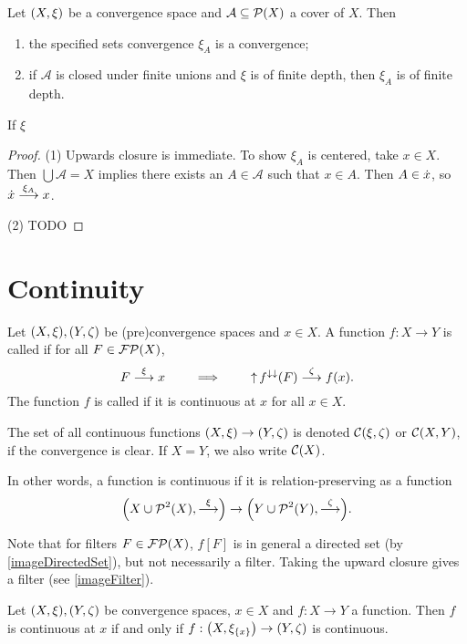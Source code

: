 \begin{lemma}
Let $\sSet{X,\xi}$ be a convergence space and $\mathcal{A}\subseteq \operatorname{\mathcal{P}}(X)$ a cover of $X$. Then
\begin{enumerate}
\item the specified sets convergence $\xi_A$ is a convergence;
\item if $\mathcal{A}$ is closed under finite unions and $\xi$ is of finite depth, then $\xi_A$ is of finite depth.
\end{enumerate}


If $\xi $
\end{lemma}
\begin{proof}
(1) Upwards closure is immediate. To show $\xi_A$ is centered, take $x\in X$. Then $\bigcup \mathcal{A} = X$ implies there exists an $A\in \mathcal{A}$ such that $x\in A$. Then $A\in \dot{x}$, so $\dot{x} \overset{\xi_A}{\longrightarrow} x$.

(2) TODO
\end{proof}



\section{Continuity}
\begin{definition}
Let $\sSet{X,\xi}, \sSet{Y,\zeta}$ be (pre)convergence spaces and $x\in X$. A function $f:X\to Y$ is called  if for all $F\in \operatorname{\mathcal{FP}}(X)$,
\[ F\overset{\xi}{\longrightarrow} x \qquad\implies\qquad \operatorname{\uparrow} f^{\downarrow\downarrow}(F) \overset{\zeta}{\longrightarrow} f(x). \]
The function $f$ is called  if it is continuous at $x$ for all $x\in X$.

The set of all continuous functions $\sSet{X,\xi} \to \sSet{Y,\zeta}$ is denoted $\operatorname{\mathcal{C}}(\xi, \zeta)$ or $\operatorname{\mathcal{C}}(X,Y)$, if the convergence is clear. If $X=Y$, we also write $\operatorname{\mathcal{C}}(X)$.
\end{definition}

In other words, a function is continuous if it is relation-preserving as a function
\[ \sSet{X \cup \powerset^2(X), \overset{\xi}{\longrightarrow}} \to \sSet{Y \cup \powerset^2(Y), \overset{\zeta}{\longrightarrow}}. \]

Note that for filters $F\in\operatorname{\mathcal{FP}}(X)$, $f[F]$ is in general a directed set (by \ref{imageDirectedSet}), but not necessarily a filter. Taking the upward closure gives a filter (see \ref{imageFilter}).

\begin{lemma} \label{continuityAtPointConvergenceLemma}
Let $\sSet{X,\xi}, \sSet{Y,\zeta}$ be convergence spaces, $x\in X$ and $f: X\to Y$ a function. Then $f$ is continuous at $x$ \textup{if and only if} $f: \sSet{X,\xi_{\{x\}}}\to \sSet{Y,\zeta}$ is continuous.
\end{lemma}


